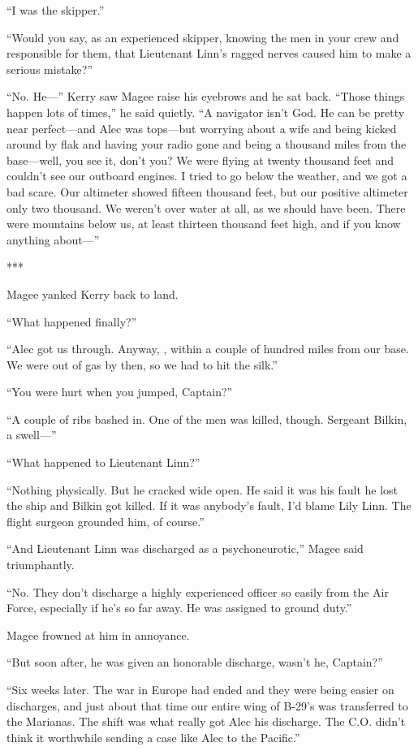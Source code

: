 \documentclass{novel}
\begin{document}
{“I was the skipper.”

“Would you say, as an experienced skipper, knowing the men in your crew and responsible for them, that Lieutenant Linn’s ragged nerves caused him to make a serious mistake?”

“No. He—” Kerry saw Magee raise his eyebrows and he sat back. “Those things happen lots of times,” he said quietly. “A navigator isn’t God. He can be pretty near perfect—and Alec was tops—but worrying about a wife and being kicked around by flak and having your radio gone and being a thousand miles from the base—well, you see it, don’t you? We were flying at twenty thousand feet and couldn’t see our outboard engines. I tried to go below the weather, and we got a bad scare. Our altimeter showed fifteen thousand feet, but our positive altimeter only two thousand. We weren’t over water at all, as we should have been. There were mountains below us, at least thirteen thousand feet high, and if you know anything about—”

***

Magee yanked Kerry back to land.

“What happened finally?”

“Alec got us through. Anyway, , within a couple of hundred miles from our base. We were out of gas by then, so we had to hit the silk.”

“You were hurt when you jumped, Captain?”

“A couple of ribs bashed in. One of the men was killed, though. Sergeant Bilkin, a swell—”

“What happened to Lieutenant Linn?”

“Nothing physically. But he cracked wide open. He said it was his fault he lost the ship and Bilkin got killed. If it was anybody’s fault, I’d blame Lily Linn. The flight surgeon grounded him, of course.”

“And Lieutenant Linn was discharged as a psychoneurotic,” Magee said triumphantly.

“No. They don’t discharge a highly experienced officer so easily from the Air Force, especially if he’s so far away. He was assigned to ground duty.”

Magee frowned at him in annoyance.

“But soon after, he was given an honorable discharge, wasn’t he, Captain?”

“Six weeks later. The war in Europe had ended and they were being easier on discharges, and just about that time our entire wing of B-29’s was transferred to the Marianas. The shift was what really got Alec his discharge. The C.O. didn’t think it worthwhile sending a case like Alec to the Pacific.”

}
\end{document}
